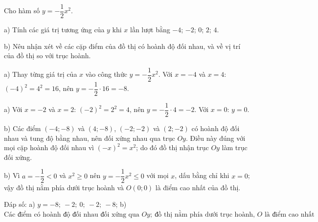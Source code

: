 \begin{problem}[9DS-HSB2-011]
Cho hàm số $y = -\dfrac{1}{2}x^2$.

a) Tính các giá trị tương ứng của $y$ khi $x$ lần lượt bằng $-4$; $-2$; $0$; $2$; $4$.

b) Nêu nhận xét về các cặp điểm của đồ thị có hoành độ đối nhau, và về vị trí của đồ thị so với trục hoành.

\begin{solution}
a) Thay từng giá trị của $x$ vào công thức $y = -\dfrac{1}{2}x^2$. Với $x = -4$ và $x = 4$: $(-4)^2 = 4^2 = 16$, nên $y = -\dfrac{1}{2} \cdot 16 = -8$.

a) Với $x = -2$ và $x = 2$: $(-2)^2 = 2^2 = 4$, nên $y = -\dfrac{1}{2} \cdot 4 = -2$. Với $x = 0$: $y = 0$.

b) Các điểm $(-4; -8)$ và $(4; -8)$, $(-2; -2)$ và $(2; -2)$ có hoành độ đối nhau và tung độ bằng nhau, nên đối xứng nhau qua trục $Oy$. Điều này đúng với mọi cặp hoành độ đối nhau vì $(-x)^2 = x^2$; do đó đồ thị nhận trục $Oy$ làm trục đối xứng.

b) Vì $a = -\dfrac{1}{2} < 0$ và $x^2 \geq 0$ nên $y = -\dfrac{1}{2}x^2 \leq 0$ với mọi $x$, dấu bằng chỉ khi $x = 0$; vậy đồ thị nằm phía dưới trục hoành và $O(0; 0)$ là điểm cao nhất của đồ thị.

Đáp số: a) $\boxed{y = -8;\ -2;\ 0;\ -2;\ -8}$; b) $\boxed{\text{Các điểm có hoành độ đối nhau đối xứng qua } Oy;\ \text{đồ thị nằm phía dưới trục hoành, } O \text{ là điểm cao nhất}}$
\end{solution}
\end{problem}

